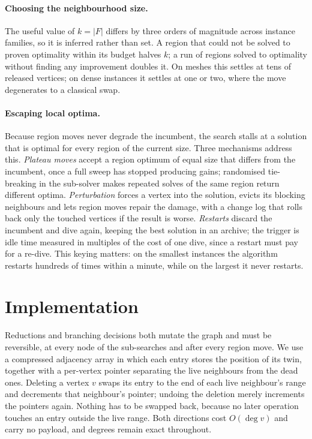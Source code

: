 \documentclass[preprint,12pt]{elsarticle}
\theoremstyle{definition}
\begin{document}
\paragraph{Choosing the neighbourhood size.} The useful value of $k=|F|$ differs
by three orders of magnitude across instance families, so it is inferred rather
than set. A region that could not be solved to proven optimality within its
budget halves $k$; a run of regions solved to optimality without finding any
improvement doubles it. On meshes this settles at tens of released vertices; on
dense instances it settles at one or two, where the move degenerates to a
classical swap.

\paragraph{Escaping local optima.} Because region moves never degrade the
incumbent, the search stalls at a solution that is optimal for every region of
the current size. Three mechanisms address this. \emph{Plateau moves} accept a
region optimum of equal size that differs from the incumbent, once a full sweep
has stopped producing gains; randomised tie-breaking in the sub-solver makes
repeated solves of the same region return different optima. \emph{Perturbation}
forces a vertex into the solution, evicts its blocking neighbours and lets
region moves repair the damage, with a change log that rolls back only the
touched vertices if the result is worse. \emph{Restarts} discard the incumbent
and dive again, keeping the best solution in an archive; the trigger is idle
time measured in multiples of the cost of one dive, since a restart must pay for
a re-dive. This keying matters: on the smallest instances the algorithm restarts
hundreds of times within a minute, while on the largest it never restarts.

\section{Implementation}
\label{sec:implementation}

Reductions and branching decisions both mutate the graph and must be reversible,
at every node of the sub-searches and after every region move. We use a compressed
adjacency array in which each entry stores the position of its twin, together
with a per-vertex pointer separating the live neighbours from the dead ones.
Deleting a vertex $v$ swaps its entry to the end of each live neighbour's range
and decrements that neighbour's pointer; undoing the deletion merely increments
the pointers again. Nothing has to be swapped back, because no later operation
touches an entry outside the live range. Both directions cost $O(\deg v)$ and
carry no payload, and degrees remain exact throughout.
\end{document}
